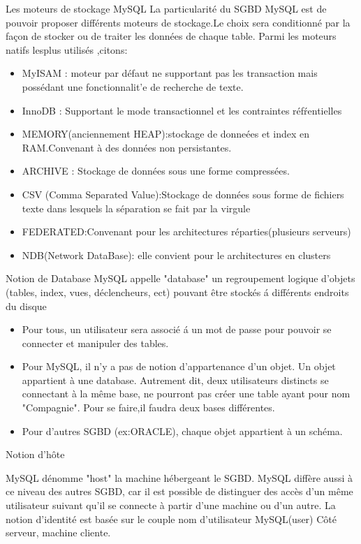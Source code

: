 \documentclass{beamer}
\begin{document}
 \begin{frame}{Les moteurs de stockage MySQL}
 La particularit\'e du SGBD MySQL est de pouvoir proposer diff\'erents moteurs de stockage.Le choix sera conditionn\'e par la façon de stocker ou de traiter les donn\'ees de chaque table. Parmi les moteurs natifs lesplus utilis\'es ,citons:
 
 \begin{itemize}
     \item MyISAM : moteur par d\'efaut ne supportant pas les transaction mais poss\'edant une fonctionnalit'e de recherche de texte.
     \item InnoDB : Supportant le mode transactionnel et les contraintes r\'ef\'rentielles
     \item MEMORY(anciennement HEAP):stockage de donne\'ees et index en RAM.Convenant \`a des donn\'ees non persistantes.
     \item ARCHIVE : Stockage de donn\'ees sous une forme compress\'ees.
     \item CSV (Comma Separated Value):Stockage de donn\'ees sous forme de fichiers texte dans lesquels la s\'eparation se fait par la virgule
     \item FEDERATED:Convenant pour les architectures r\'eparties(plusieurs serveurs)
     \item NDB(Network DataBase): elle convient pour le architectures en clusters
     
 \end{itemize}
 \end{frame}
\begin{frame}{Notion de Database} 
MySQL appelle "database" un regroupement logique d'objets (tables, index, vues, d\'eclencheurs, ect) pouvant être stock\'es \'a diff\'erents endroits du disque
\begin{itemize}
      \item Pour tous, un utilisateur sera  associ\'e \'a un mot de passe pour pouvoir se connecter et manipuler des tables.
      \item Pour MySQL, il n'y a pas de notion d'appartenance d'un objet. Un objet appartient \`a une database. Autrement dit, deux utilisateurs distincts se connectant à la m\^eme base, ne pourront pas cr\'eer une table ayant pour nom "Compagnie". Pour se faire,il faudra deux bases diff\'erentes.
      \item Pour d'autres SGBD (ex:ORACLE), chaque objet appartient \`a un sch\'ema.
  \end{itemize}
  \end{frame}
\begin{frame}{Notion d'h\^ote}

MySQL d\'enomme "host" la machine h\'ebergeant le SGBD. MySQL diff\`ere aussi \`a ce niveau des autres SGBD, car il est possible de distinguer des acc\`es d'un m\^eme utilisateur suivant qu'il se connecte \`a partir d'une machine ou d'un autre. La notion d'identit\'e est bas\'ee sur le couple nom d'utilisateur MySQL(user) C\^ot\'e serveur, machine cliente.

\end{frame}
\end{document}
